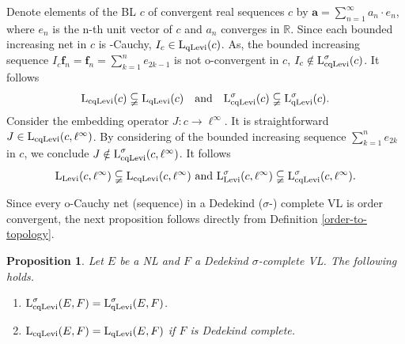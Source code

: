 \documentclass[10pt]{article}
\makeatletter
\newtheorem{proposition}[theorem]{Proposition}
\renewcommand{\subsection}{\@startsection{subsection}{1}
{0pt}{3.25ex plus 1ex minus.2ex}{-1em}{\normalfont\normalsize\bf}}
\makeatother
\begin{document}
{{{\medskip
\noindent
Denote elements of the BL $c$ of convergent real sequences
$c$ by $\mathbf{a}=\sum_{n=1}^\infty a_n \cdot e_n$,
where $e_n$ is the n-th unit vector of $c$ and $a_n$ converges in $\mathbb{R}$.
Since each bounded increasing
net in $c$ is -Cauchy, $I_c\in\text{\rm L}_{\text{\rm qLevi}}(c)$.
As, the bounded increasing sequence $I_c\mathbf{f}_n=\mathbf{f}_n=\sum_{k=1}^n e_{2k-1}$ is not 
o-convergent in $c$, $I_c\notin\text{\rm L}^\sigma_{\text{\rm cqLevi}}(c)$.
It follows
$$
   \text{\rm L}_{\text{\rm cqLevi}}(c)\subsetneqq\text{\rm L}_{\text{\rm qLevi}}(c) \ \ \ 
   \text{\rm and} \ \ \ 
   \text{\rm L}^\sigma_{\text{\rm cqLevi}}(c)\subsetneqq\text{\rm L}^\sigma_{\text{\rm qLevi}}(c).
$$
\medskip
\noindent
Consider the embedding operator $J:c\to\ell^\infty$.
It is straightforward $J\in\text{\rm L}_{\text{\rm cqLevi}}(c,\ell^\infty)$.
By considering of the bounded increasing sequence $\sum_{k=1}^n e_{2k}$ in $c$,
we conclude $J\notin\text{\rm L}^\sigma_{\text{\rm cqLevi}}(c,\ell^\infty)$.
It follows
$$
   \text{\rm L}_{\text{\rm Levi}}(c,\ell^\infty)\subsetneqq
   \text{\rm L}_{\text{\rm cqLevi}}(c,\ell^\infty)\ 
   \text{\rm and} \
   \text{\rm L}^\sigma_{\text{\rm Levi}}(c,\ell^\infty)\subsetneqq
   \text{\rm L}^\sigma_{\text{\rm cqLevi}}(c,\ell^\infty).
$$

\medskip
Since every o-Cauchy net (sequence) in a Dedekind ($\sigma$-) complete VL is order convergent, the next proposition
follows directly from Definition \ref{order-to-topology}. 

\begin{proposition}\label{prop1bb}%
Let $E$ be a NL and $F$ a Dedekind $\sigma$-complete VL. 
The following holds.
\begin{enumerate}[$a)$]
\item 
$\text{\rm L}^\sigma_{\text{\rm cqLevi}}(E,F)=
\text{\rm L}^\sigma_{\text{\rm qLevi}}(E,F)$.
\item 
$\text{\rm L}_{\text{\rm cqLevi}}(E,F)=
\text{\rm L}_{\text{\rm qLevi}}(E,F)$
if $F$ is Dedekind complete.
\end{enumerate}
\end{proposition}

}}}
\end{document}
